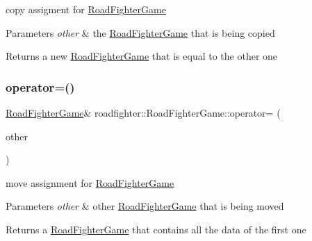 copy assigment for \hyperlink{classroadfighter_1_1RoadFighterGame}{Road\+Fighter\+Game} 
\begin{DoxyParams}{Parameters}
{\em other} & the \hyperlink{classroadfighter_1_1RoadFighterGame}{Road\+Fighter\+Game} that is being copied \\
\hline
\end{DoxyParams}
\begin{DoxyReturn}{Returns}
a new \hyperlink{classroadfighter_1_1RoadFighterGame}{Road\+Fighter\+Game} that is equal to the other one 
\end{DoxyReturn}
\mbox{\label{classroadfighter_1_1RoadFighterGame_a8887e487ce6d91da4c380eee1d3d7051}} 
\subsubsection{\texorpdfstring{operator=()}{operator=()}\hspace{0.1cm}{\footnotesize\ttfamily [2/2]}}
{\footnotesize\ttfamily \hyperlink{classroadfighter_1_1RoadFighterGame}{Road\+Fighter\+Game}\& roadfighter\+::\+Road\+Fighter\+Game\+::operator= (\begin{DoxyParamCaption}\item[{\hyperlink{classroadfighter_1_1RoadFighterGame}{Road\+Fighter\+Game} \&\&}]{other }\end{DoxyParamCaption})\hspace{0.3cm}{\ttfamily [default]}}

move assignment for \hyperlink{classroadfighter_1_1RoadFighterGame}{Road\+Fighter\+Game} 
\begin{DoxyParams}{Parameters}
{\em other} & other \hyperlink{classroadfighter_1_1RoadFighterGame}{Road\+Fighter\+Game} that is being moved \\
\hline
\end{DoxyParams}
\begin{DoxyReturn}{Returns}
a \hyperlink{classroadfighter_1_1RoadFighterGame}{Road\+Fighter\+Game} that contains all the data of the first one 
\end{DoxyReturn}
\mbox{\label{classroadfighter_1_1RoadFighterGame_a524013650ed53899e8ec56b54e31f1c7}} 
